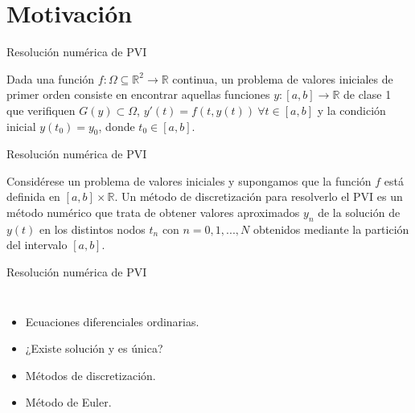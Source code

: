 
\section{Motivación}

{
	
	\begin{frame}{Resolución numérica de PVI}
		\begin{definition} 
			Dada una función $f:\Omega \subseteq \mathbb R^2  \to \mathbb{R}$ continua, un problema de valores iniciales de primer orden consiste en encontrar aquellas funciones $y: [a,b] \rightarrow \mathbb{R}$ de clase 1 que verifiquen $G(y) \subset \Omega$, $y'(t) = f(t,y(t)) \ \forall t \in [a,b]$ y la condición inicial $y(t_0) = y_0$, donde $t_0 \in [a,b]$.  
		\end{definition}
	\end{frame}
	
	\begin{frame}{Resolución numérica de PVI}
		\begin{definition} 
			Considérese un problema de valores iniciales y supongamos que la función $f$ está definida en $[a,b]\times\mathbb{R}$. Un método de discretización para resolverlo el PVI es un método numérico que trata de obtener valores aproximados $y_n$ de la solución de $y(t)$ en los distintos nodos $t_n$ con $n={0,1,...,N}$ obtenidos mediante la partición del intervalo $[a,b]$.  
		\end{definition}
	\end{frame}
		
		
	\begin{frame}{Resolución numérica de PVI}
		\begin{columns}
			\begin{itemize}
				\item Ecuaciones diferenciales ordinarias.
				\item ¿Existe solución y es única?
				\item Métodos de discretización.
				\item Método de Euler.		
			\end{itemize}
			

\end{columns}
\end{frame}}
